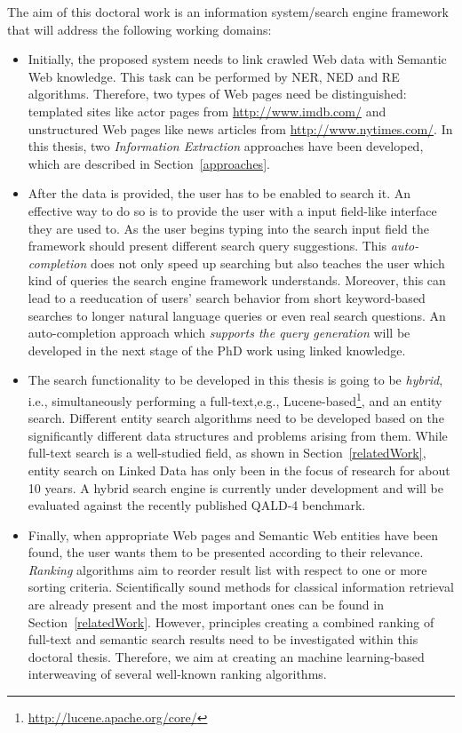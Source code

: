 The aim of this doctoral work is an information system/search engine framework that will address the following working domains: 
\begin{itemize}
\item[(1)]Initially, the proposed system needs to link crawled Web data with Semantic Web knowledge.
This task can be performed by NER, NED and RE algorithms. 
Therefore, two types of Web pages need be distinguished: templated sites like actor pages from \url{http://www.imdb.com/} and unstructured Web pages like news articles from \url{http://www.nytimes.com/}.
In this thesis, two \emph{Information Extraction} approaches have been developed, which are described in Section~\ref{approaches}.
\item[(2)]After the data is provided, the user has to be enabled to search it. 
An effective way to do so is to provide the user with a input field-like interface they are used to. 
As the user begins typing into the search input field the framework should present different search query suggestions.
This \emph{auto-completion} does not only speed up searching but also teaches the user which kind of queries the search engine framework understands. 
Moreover, this can lead to a reeducation of users' search behavior from short keyword-based searches to longer natural language queries or even real search questions.
An auto-completion approach which \emph{supports the query generation} will be developed in the next stage of the PhD work using linked knowledge.

\item[(3)]The search functionality to be developed in this thesis is going to be \emph{hybrid}, i.e., simultaneously performing a full-text,e.g., Lucene-based\footnote{\url{http://lucene.apache.org/core/}}, and an entity search. 
Different entity search algorithms need to be developed based on the significantly different data structures and problems arising from them. 
While full-text search is a well-studied field, as shown in Section~\ref{relatedWork}, entity search on Linked Data has only been in the focus of research for about 10 years.
A hybrid search engine is currently under development and will be evaluated against the recently published QALD-4 benchmark.

\item[(4)]Finally, when appropriate Web pages and Semantic Web entities have been found, the user wants them to be presented according to their relevance.
\emph{Ranking} algorithms aim to reorder result list with respect to one or more sorting criteria.
Scientifically sound methods for classical information retrieval are already present and the most important ones can be found in Section~\ref{relatedWork}.
However, principles creating a combined ranking of full-text and semantic search results need to be investigated within this doctoral thesis.
Therefore, we aim at creating an machine learning-based interweaving of several well-known ranking algorithms.
\end{itemize}

